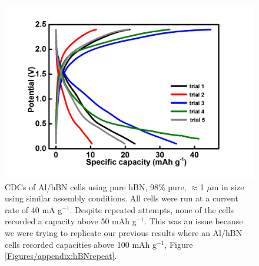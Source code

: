 \begin{figure}[tbh!]
\centering
\includegraphics[width=\textwidth]{Figures/appendix/hBNmultiattempts}
\caption{CDCs of Al/hBN cells using pure hBN, 98\% pure, $\approx$1 $\mu$m in size using similar assembly conditions. All cells were run at a current rate of 40 mA g$^{-1}$. Despite repeated attempts, none of the cells recorded a capacity above 50 mAh g$^{-1}$. This was an issue because we were trying to replicate our previous results where an Al/hBN cells recorded capacities above 100 mAh g$^{-1}$, Figure \ref{Figures/appendix:hBNrepeat}.}
\label{Figures/appendix:hBNmultiattempts}
\end{figure}

